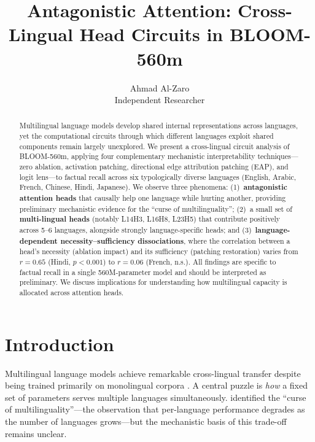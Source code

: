\documentclass[11pt]{article}
\title{Antagonistic Attention: Cross-Lingual Head Circuits in BLOOM-560m}
\author{
  Ahmad Al-Zaro \\
  Independent Researcher
}
\begin{document}
\maketitle

\begin{abstract}
Multilingual language models develop shared internal representations across languages, yet the computational circuits through which different languages exploit shared components remain largely unexplored.
We present a cross-lingual circuit analysis of BLOOM-560m, applying four complementary mechanistic interpretability techniques---zero ablation, activation patching, directional edge attribution patching (EAP), and logit lens---to factual recall across six typologically diverse languages (English, Arabic, French, Chinese, Hindi, Japanese).
We observe three phenomena: (1)~\textbf{antagonistic attention heads} that causally help one language while hurting another, providing preliminary mechanistic evidence for the ``curse of multilinguality''; (2)~a small set of \textbf{multi-lingual heads} (notably L14H3, L16H8, L23H5) that contribute positively across 5--6 languages, alongside strongly language-specific heads; and (3)~\textbf{language-dependent necessity--sufficiency dissociations}, where the correlation between a head's necessity (ablation impact) and its sufficiency (patching restoration) varies from $r=0.65$ (Hindi, $p < 0.001$) to $r=0.06$ (French, n.s.).
All findings are specific to factual recall in a single 560M-parameter model and should be interpreted as preliminary.
We discuss implications for understanding how multilingual capacity is allocated across attention heads.
\end{abstract}

\section{Introduction}

Multilingual language models achieve remarkable cross-lingual transfer despite being trained primarily on monolingual corpora \cite{pires2019multilingual, conneau2020unsupervised}.
A central puzzle is \emph{how} a fixed set of parameters serves multiple languages simultaneously.
\citet{conneau2020unsupervised} identified the ``curse of multilinguality''---the observation that per-language performance degrades as the number of languages grows---but the mechanistic basis of this trade-off remains unclear.
\end{document}
